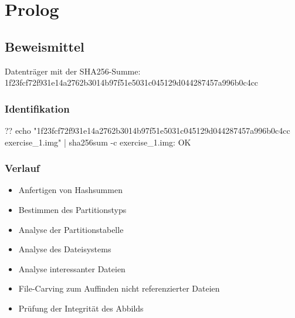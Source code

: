 \chapter{Prolog}

\section{Beweismittel}

Datenträger mit der SHA256-Summe:\\ 
1f23fcf72f931e14a2762b3014b97f51e5031c045129d044287457a996b0c4cc

\subsection{Identifikation}

??
echo "1f23fcf72f931e14a2762b3014b97f51e5031c045129d044287457a996b0c4cc exercise\_1.img" | sha256sum -c
exercise\_1.img: OK

\subsection{Verlauf}
	\begin{itemize}
	\item Anfertigen von Hashsummen
	\item Bestimmen des Partitionstyps
	\item Analyse der Partitionstabelle
	\item Analyse des Dateisystems
	\item Analyse interessanter Dateien
	\item File-Carving zum Auffinden nicht referenzierter Dateien
	\item Prüfung der Integrität des Abbilds
	\end{itemize}

